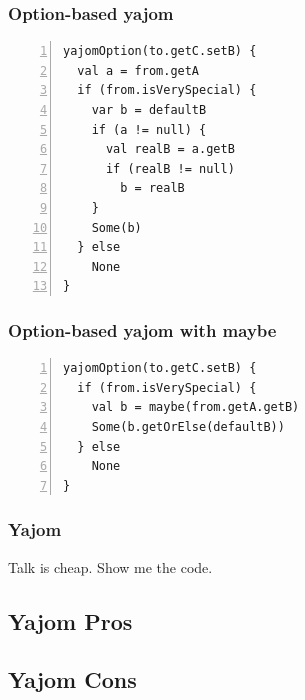 \documentclass[14pt]{beamer}
\begin{document}
\begin{frame}[t,fragile]
\frametitle{Option-based yajom}
\begin{lstlisting}[numbers=left,xleftmargin=20pt]
yajomOption(to.getC.setB) {
  val a = from.getA
  if (from.isVerySpecial) {
    var b = defaultB
    if (a != null) {
      val realB = a.getB
      if (realB != null)
        b = realB
    }
    Some(b)
  } else
    None
}
\end{lstlisting}
\end{frame}

\begin{frame}[t,fragile]
\frametitle{Option-based yajom with maybe}
\begin{lstlisting}[numbers=left,xleftmargin=20pt]
yajomOption(to.getC.setB) {
  if (from.isVerySpecial) {
    val b = maybe(from.getA.getB)
    Some(b.getOrElse(defaultB))
  } else
    None
}
\end{lstlisting}
\end{frame}

\frame
{\frametitle{Yajom}
\begin{center}
  \large Talk is cheap. Show me the code.
\end{center}
}

\subsection{Yajom Pros}

\subsection{Yajom Cons}
\end{document}
